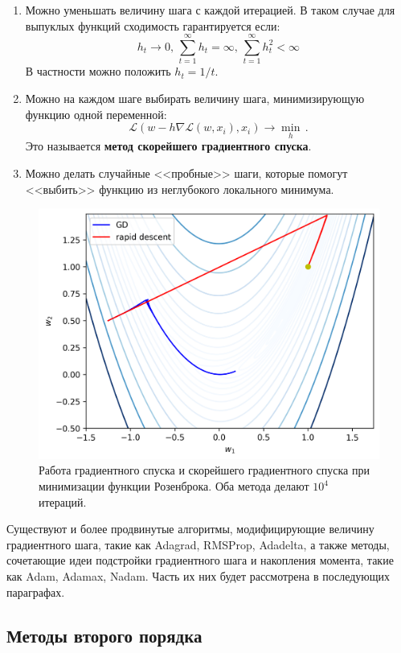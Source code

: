 \begin{enumerate}
	\item Можно уменьшать величину шага с каждой итерацией. В таком случае для выпуклых функций сходимость гарантируется если:
	      \[
		      h_t \rightarrow 0,\, \sum_{t = 1}^{\infty} h_t = \infty,\, \sum_{t=1}^{\infty} h_t^2 < \infty
	      \]
	      В частности можно положить $h_t = 1 / t$.
	\item Можно на каждом шаге выбирать величину шага, минимизирующую функцию одной переменной:
	      \[
		      \mathcal{L}(w - h \nabla \mathcal{L}(w, x_i), x_i) \rightarrow \min_h\,.
	      \]
	      Это называется \textbf{метод скорейшего градиентного спуска}.
	\item Можно делать случайные <<пробные>> шаги, которые помогут <<выбить>> функцию из неглубокого локального минимума.
\end{enumerate}

\begin{figure}[h]
	\centering
	\includegraphics[width=0.6\linewidth]{chapters/neural/images/gd_rd_example.png}
	\caption{Работа градиентного спуска и скорейшего градиентного спуска при минимизации функции Розенброка. Оба метода делают $10^4$ итераций.}
	\label{img:gd_osc}
\end{figure}

\begin{remark}
	Существуют и более продвинутые алгоритмы, модифицирующие величину градиентного шага, такие как Adagrad, RMSProp, Adadelta, а также методы, сочетающие идеи подстройки градиентного шага и накопления момента, такие как Adam, Adamax, Nadam. Часть их них будет рассмотрена в последующих параграфах.
\end{remark}

\subsection{Методы второго порядка}

